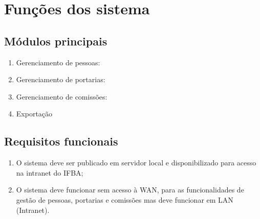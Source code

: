 \documentclass{scrreprt}
\begin{document}
\chapter{Funções dos sistema}

\section{Módulos principais}
\begin{enumerate}
    \item Gerenciamento de pessoas:
    \item Gerenciamento de portarias:
    \item Gerenciamento de comissões:
    \item Exportação
\end{enumerate}


\section{Requisitos funcionais}


\begin{enumerate}[label=\textbf{RF-\arabic*}]
\item
O sistema deve ser publicado em servidor local e disponibilizado para acesso na intranet do IFBA;

\item
O sistema deve funcionar sem acesso à WAN, para as funcionalidades de gestão de pessoas, portarias e comissões mas deve funcionar em LAN (Intranet).
\end{enumerate}
\end{document}

